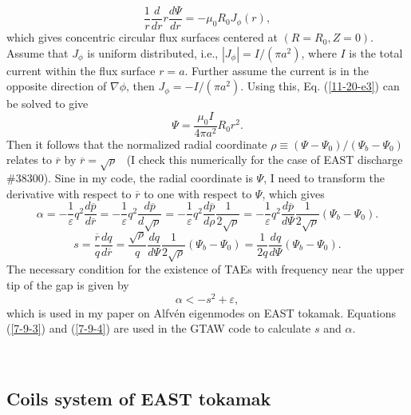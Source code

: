 \documentclass{article}
\begin{document}
\begin{equation}
  \label{11-20-e3} \frac{1}{r}  \frac{d}{d r} r \frac{d \Psi}{d r} = - \mu_0
  R_0 J_{\phi} (r),
\end{equation}
which gives concentric circular flux surfaces centered at $(R = R_0, Z = 0)$.
Assume that $J_{\phi}$ is uniform distributed, i.e., $|J_{\phi} | = I / (\pi
a^2)$, where $I$ is the total current within the flux surface $r = a$. Further
assume the current is in the opposite direction of $\nabla \phi$, then
$J_{\phi} = - I / (\pi a^2)$. Using this, Eq. (\ref{11-20-e3}) can be solved
to give
\begin{equation}
  \label{11-21-4} \Psi = \frac{\mu_0 I}{4 \pi a^2} R_0 r^2 .
\end{equation}
Then it follows that the normalized radial coordinate $\rho \equiv (\Psi -
\Psi_0) / (\Psi_b - \Psi_0)$ relates to $\overline{r}$ by $\overline{r} =
\sqrt{\rho}$ \ (I check this numerically for the case of EAST discharge
\#38300). Sine in my code, the radial coordinate is $\Psi$, I need to
transform the derivative with respect to $\overline{r}$ to one with respect to
$\Psi$, which gives
\begin{equation}
  \label{7-9-3} \alpha = - \frac{1}{\varepsilon} q^2  \frac{d \overline{p}}{d
  \overline{r}} = - \frac{1}{\varepsilon} q^2  \frac{d \overline{p}}{d
  \sqrt{\rho}} = - \frac{1}{\varepsilon} q^2  \frac{d \overline{p}}{d \rho} 
  \frac{1}{2 \sqrt{\rho}} = - \frac{1}{\varepsilon} q^2  \frac{d
  \overline{p}}{d \Psi}  \frac{1}{2 \sqrt{\rho}} (\Psi_b - \Psi_0) .
\end{equation}
\begin{equation}
  \label{7-9-4} s = \frac{\overline{r}}{q}  \frac{d q}{d \overline{r}} =
  \frac{\sqrt{\rho}}{q}  \frac{d q}{d \Psi}  \frac{1}{2 \sqrt{\rho}} (\Psi_b -
  \Psi_0) = \frac{1}{2 q}  \frac{d q}{d \Psi}  (\Psi_b - \Psi_0) .
\end{equation}
The necessary condition for the existence of TAEs with frequency near the
upper tip of the gap is given by{\cite{berk1995}}
\begin{equation}
  \alpha < - s^2 + \varepsilon,
\end{equation}
which is used in my paper on Alfv{\'e}n eigenmodes on EAST
tokamak{\cite{hu2014}}. Equations (\ref{7-9-3}) and (\ref{7-9-4}) are used in
the GTAW code to calculate $s$ and $\alpha$.

\

\subsection{Coils system of EAST tokamak}
\end{document}
